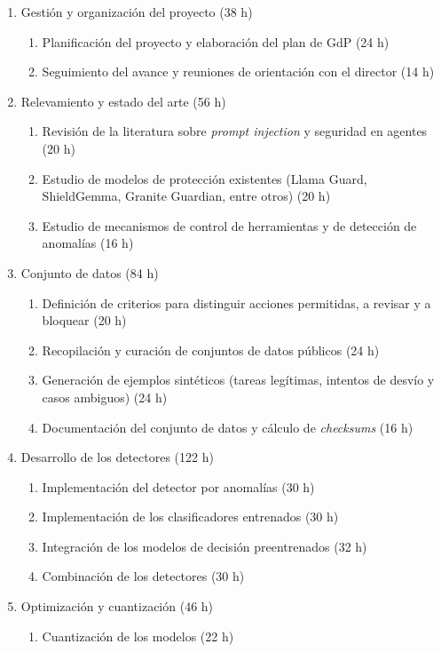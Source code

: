 \documentclass[
11pt, %
]{charter}
\begin{document}
\begin{enumerate}
\item Gestión y organización del proyecto (38 h)
	\begin{enumerate}
	\item Planificación del proyecto y elaboración del plan de GdP (24 h)
	\item Seguimiento del avance y reuniones de orientación con el director (14 h)
	\end{enumerate}
\item Relevamiento y estado del arte (56 h)
	\begin{enumerate}
	\item Revisión de la literatura sobre \textit{prompt injection} y seguridad en agentes (20 h)
	\item Estudio de modelos de protección existentes (Llama Guard, ShieldGemma, Granite Guardian, entre otros) (20 h)
	\item Estudio de mecanismos de control de herramientas y de detección de anomalías (16 h)
	\end{enumerate}
\item Conjunto de datos (84 h)
	\begin{enumerate}
	\item Definición de criterios para distinguir acciones permitidas, a revisar y a bloquear (20 h)
	\item Recopilación y curación de conjuntos de datos públicos (24 h)
	\item Generación de ejemplos sintéticos (tareas legítimas, intentos de desvío y casos ambiguos) (24 h)
	\item Documentación del conjunto de datos y cálculo de \textit{checksums} (16 h)
	\end{enumerate}
\item Desarrollo de los detectores (122 h)
	\begin{enumerate}
	\item Implementación del detector por anomalías (30 h)
	\item Implementación de los clasificadores entrenados (30 h)
	\item Integración de los modelos de decisión preentrenados (32 h)
	\item Combinación de los detectores (30 h)
	\end{enumerate}
\item Optimización y cuantización (46 h)
	\begin{enumerate}
	\item Cuantización de los modelos (22 h)

\end{enumerate}
\end{enumerate}
\end{document}
